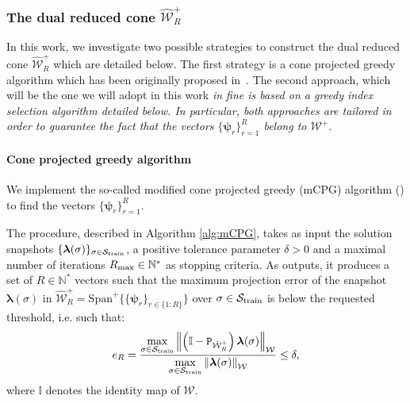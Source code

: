 \subsubsection{The dual reduced cone $\hat{\mathcal{W}}_R^+$}
\label{sec:dual_basis}

In this work, we investigate two possible strategies to construct the dual reduced cone $\hat{\mathcal{W}}_R^+$ which are detailed below. The first strategy is a cone projected greedy algorithm which has been originally proposed in~\cite{niakh2023stable}. The second approach, which will be the one we will adopt in this work \itshape in fine \normalfont is based on a greedy index selection algorithm detailed below. In particular, both approaches are tailored in order to guarantee the fact that the vectors $\{\boldsymbol{\psi}_r\}_{r=1}^R$ belong to $\mathcal W^+$.


\paragraph{Cone projected greedy algorithm}
We implement the so-called modified cone projected greedy (mCPG) algorithm (\cite{niakh2023stable}) to find the vectors $\{\boldsymbol{\psi}_r\}_{r=1}^R$.

The procedure, described in Algorithm \ref{alg:mCPG}, takes as input the solution snapshots $\{\boldsymbol{\lambda}(\sigma)\}_{\sigma\in\mathcal S_{\rm train}}$, a positive tolerance parameter $\delta>0$ and a maximal number of iterations $R_{\rm max}\in \mathbb{N}^*$ as stopping criteria. As outputs, it produces a set of $R \in \mathbb{N}^*$ vectors such that the maximum projection error of the snapshot $\boldsymbol{\lambda}(\sigma)$ in $\mathcal{\hat{W}}_R^+=\text{Span}^+\{\{\boldsymbol{\psi}_r\}_{r\in \{1:R \}}\}$ over $\sigma \in \mathcal S_{\rm train}$ is below the requested threshold, i.e. such that:
\begin{equation}
\label{eq:mCPG_err}
    e_R =\frac{\displaystyle{\max_{\sigma \in\mathcal S_{\rm train}}} \left\|\left(\mathbb{I}-\texttt{P}_{\hat{\mathcal{W}}_R^+}\right)\boldsymbol{\lambda}(\sigma)\right\|_{\mathcal{W}}}{\displaystyle{\max_{\sigma \in\mathcal S_{\rm train}}}\left\|\boldsymbol{\lambda}(\sigma)\right\|_{\mathcal{W}}}\leq \delta, 
\end{equation}
where $\mathbb{I}$ denotes the identity map of $\mathcal W$.

